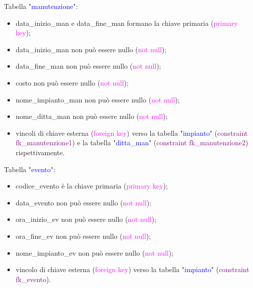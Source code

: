 \documentclass{article}
\begin{document}
    \begin{flushleft}
        Tabella "\textcolor{blue}{manutenzione}": \\
        \begin{itemize}
            \item data\_inizio\_man e data\_fine\_man formano la chiave primaria (\textcolor{magenta}{primary key});
            \item data\_inizio\_man non può essere nullo (\textcolor{magenta}{not null}); \\
            \item data\_fine\_man non può essere nullo (\textcolor{magenta}{not null}); \\
            \item costo non può essere nullo (\textcolor{magenta}{not null}); \\
            \item nome\_impianto\_man non può essere nullo (\textcolor{magenta}{not null}); \\
            \item nome\_ditta\_man non può essere nullo (\textcolor{magenta}{not null}); \\
            \item vincoli di chiave esterna (\textcolor{magenta}{foreign key}) verso la tabella "\textcolor{blue}{impianto}" (\textcolor{purple}{constraint fk\_manutenzione1}) e la tabella "\textcolor{blue}{ditta\_man}" (\textcolor{purple}{constraint fk\_manutenzione2}) rispettivamente. \\
        \end{itemize}        
    \end{flushleft}

    \begin{flushleft}
        Tabella "\textcolor{blue}{evento}": \\
        \begin{itemize}
            \item codice\_evento è la chiave primaria (\textcolor{magenta}{primary key}); \\
            \item data\_evento non può essere nullo (\textcolor{magenta}{not null}); \\
            \item ora\_inizio\_ev non può essere nullo (\textcolor{magenta}{not null}); \\
            \item ora\_fine\_ev non può essere nullo (\textcolor{magenta}{not null}); \\
            \item nome\_impianto\_ev non può essere nullo (\textcolor{magenta}{not null}); \\
            \item vincolo di chiave esterna (\textcolor{magenta}{foreign key}) verso la tabella "\textcolor{blue}{impianto}" (\textcolor{purple}{constraint fk\_evento}). \\
        \end{itemize}        
    \end{flushleft}
\end{document}
